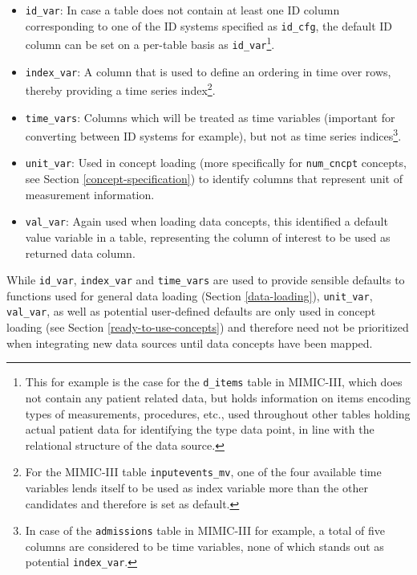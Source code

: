 \documentclass[
  notitle]{jss}
\providecommand{\tightlist}{%
  \setlength{\itemsep}{0pt}\setlength{\parskip}{0pt}}
\begin{document}
\begin{itemize}
\tightlist
\item
  \texttt{id\_var}: In case a table does not contain at least one ID
  column corresponding to one of the ID systems specified as
  \texttt{id\_cfg}, the default ID column can be set on a per-table
  basis as \texttt{id\_var}\footnote{This for example is the case for
    the \texttt{d\_items} table in MIMIC-III, which does not contain any
    patient related data, but holds information on items encoding types
    of measurements, procedures, etc., used throughout other tables
    holding actual patient data for identifying the type data point, in
    line with the relational structure of the data source.}.
\item
  \texttt{index\_var}: A column that is used to define an ordering in
  time over rows, thereby providing a time series index\footnote{For the
    MIMIC-III table \texttt{inputevents\_mv}, one of the four available
    time variables lends itself to be used as index variable more than
    the other candidates and therefore is set as default.}.
\item
  \texttt{time\_vars}: Columns which will be treated as time variables
  (important for converting between ID systems for example), but not as
  time series indices\footnote{In case of the \texttt{admissions} table
    in MIMIC-III for example, a total of five columns are considered to
    be time variables, none of which stands out as potential
    \texttt{index\_var}.}.
\item
  \texttt{unit\_var}: Used in concept loading (more specifically for
  \texttt{num\_cncpt} concepts, see Section \ref{concept-specification})
  to identify columns that represent unit of measurement information.
\item
  \texttt{val\_var}: Again used when loading data concepts, this
  identified a default value variable in a table, representing the
  column of interest to be used as returned data column.
\end{itemize}

While \texttt{id\_var}, \texttt{index\_var} and \texttt{time\_vars} are
used to provide sensible defaults to functions used for general data
loading (Section \ref{data-loading}), \texttt{unit\_var},
\texttt{val\_var}, as well as potential user-defined defaults are only
used in concept loading (see Section \ref{ready-to-use-concepts}) and
therefore need not be prioritized when integrating new data sources
until data concepts have been mapped.
\end{document}
